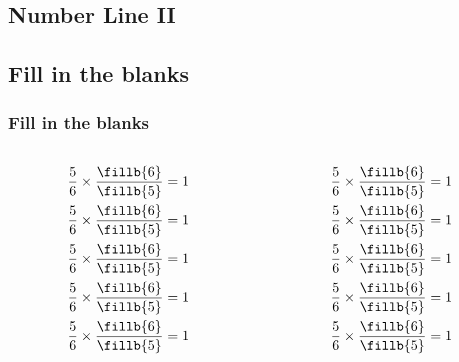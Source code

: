    	   \subsection[]{Number Line II}
   	    \begin{frame}
   	     \end{frame}  	   
   	   
   	   \subsection[]{Fill in the blanks}
   	   \begin{frame}
   	   	 \frametitle{Fill in the blanks}
   	   	 \vspace*{-10pt}
   	   	\setcounter{equation}{0} 
   	   	\begin{columns}[t]
   	   		\begin{column}{0.5\textwidth}
   	   			\begin{align}
   	   			\dfrac{5}{6}\times\dfrac{\fillb{6}}{\fillb{5}} &= 1 \\
   	   			\dfrac{5}{6}\times\dfrac{\fillb{6}}{\fillb{5}} &= 1 \\
   	   			\dfrac{5}{6}\times\dfrac{\fillb{6}}{\fillb{5}} &= 1 \\
   	   			\dfrac{5}{6}\times\dfrac{\fillb{6}}{\fillb{5}} &= 1 \\
   	   			\dfrac{5}{6}\times\dfrac{\fillb{6}}{\fillb{5}} &= 1
   	   			\end{align}
   	   		\end{column}
   	   		\begin{column}{0.5\textwidth}
   	   			\begin{align}
   	   			\dfrac{5}{6}\times\dfrac{\fillb{6}}{\fillb{5}} &= 1 \\
   	   			\dfrac{5}{6}\times\dfrac{\fillb{6}}{\fillb{5}} &= 1 \\
   	   			\dfrac{5}{6}\times\dfrac{\fillb{6}}{\fillb{5}} &= 1 \\
   	   			\dfrac{5}{6}\times\dfrac{\fillb{6}}{\fillb{5}} &= 1 \\
   	   			\dfrac{5}{6}\times\dfrac{\fillb{6}}{\fillb{5}} &= 1
   	   			\end{align}
   	   		\end{column}
   	   	\end{columns}
   	   \end{frame}
   	   
